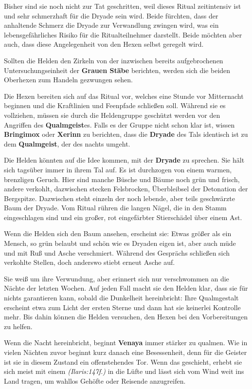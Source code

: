 Bisher sind sie noch nicht zur Tat geschritten, weil dieses Ritual zeitintensiv ist und sehr schmerzhaft für die Dryade sein wird.
Beide fürchten, dass der anhaltende Schmerz die Dryade zur Verwandlung zwingen wird, was ein lebensgefährliches Risiko für die Ritualteilnehmer darstellt.
Beide möchten aber auch, dass diese Angelegenheit von den Hexen selbst geregelt wird.

Sollten die Helden den Zirkeln von der inzwischen bereits aufgebrochenen Untersuchungseinheit der \textbf{Grauen Stäbe} berichten, werden sich die beiden Oberhexen zum Handeln gezwungen sehen.

Die Hexen bereiten sich auf das Ritual vor, welches eine Stunde vor Mitternacht beginnen und die Kraftlinien und Feenpfade schließen soll.
Während sie es vollziehen, müssen sie durch die Heldengruppe geschützt werden vor den Angriffen des \textbf{Qualmgeist}es.
Falls es der Gruppe nicht schon klar ist, wissen \textbf{Bringimox} oder \textbf{Xerinn} zu berichten,
dass die \textbf{Dryade} des Tals identisch ist zu dem \textbf{Qualmgeist}, der des nachts umgeht.


Die Helden könnten auf die Idee kommen, mit der \textbf{Dryade} zu sprechen.
Sie hält sich tagsüber immer in ihrem Tal auf.
Es ist durchzogen von einem warmen, brenzligen Geruch.
Hier sind manche Büsche und Bäume noch grün und frisch, andere verkohlt, dazwischen stecken Felsbrocken, Überbleibsel der Detonation der Bergspitze.
Dazwischen steht einzeln der noch lebende, aber teils geschwärzte Baum der Dryade.
Vom Ritual rühren die langen Nägel, die in den Stamm eingeschlagen sind und ein großer, rot eingefärbter Stierschädel über einem Ast.

Wenn die Helden sich den Baum ansehen, erscheint sie:
Etwas größer als ein Mensch, so grün belaubt und schön wie es Dryaden eigen ist, aber auch müde und mit Ruß und Asche verschmiert.
Während des Gesprächs schließen sich verkohlte Stellen, doch anderswo stiebt erneut Asche auf.


Sie weiß um ihre Verwundung, aber erinnert sich nur verschwommen an die Nächte der letzten Wochen.
Auf jeden Fall macht sie den Helden klar, dass sie für nichts garantieren kann, sobald die Dunkelheit hereinbricht:
Ihre Qualmgestalt erscheint etwa zum Licht der ersten Sterne und dann hat sie keinerlei Kontrolle mehr.
Bis dahin können die Helden versuchen, den Hexen bei den Vorbereitungen zu helfen.


Wenn die Nacht hereinbricht, beginnt \textbf{Venaya} immer stärker zu qualmen.
Wie in vielen Nächten zuvor beginnt kurz danach eine Besessenheit, denn für die Geister ist sie in diesem Zustand ein offenstehendes Tor.
Wenn das geschieht, erhebt sie sich meist mit einem  \emph{(Ilaris:147f.)} in die Lüfte und lässt sich vom Wind weit ins Land tragen, um wahllos Gehöfte oder Reisende anzugreifen.


